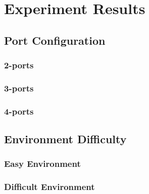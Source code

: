 \section{Experiment Results}
\subsection{Port Configuration}
\subsubsection{2-ports}
\begin{figure}[H]
	
\end{figure}

\subsubsection{3-ports}
\begin{figure}[H]
	
\end{figure}

\subsubsection{4-ports}
\begin{figure}[H]
	
\end{figure}

\subsection{Environment Difficulty}
\subsubsection{Easy Environment}
\begin{figure}[H]
	
\end{figure}

\subsubsection{Difficult Environment}
\begin{figure}[H]
	
\end{figure}

